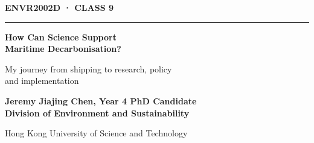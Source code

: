 \documentclass[aspectratio=169,11pt]{beamer}
\newcommand{\partlabel}[1]{%
  {\color{Navy}\fontsize{9}{11}\selectfont\bfseries\MakeUppercase{#1}\par}
}
\begin{document}
\begin{frame}[plain]
  \vspace{0.55cm}
  \partlabel{ENVR2002D · Class 9}
  \vspace{0.2cm}
  {\color{Navy}\rule{\textwidth}{0.8pt}\par}

  \vspace{0.5cm}
  {\color{Ink}\fontsize{29}{33}\selectfont\bfseries
    How Can Science Support\\
    Maritime Decarbonisation?
  \par}

  \vspace{0.5cm}
  {\color{Ink}\fontsize{15}{20}\selectfont
    My journey from shipping to research, policy\\
    and implementation
  \par}

  \vfill
  {\color{Ink}\fontsize{11.2}{14}\selectfont\bfseries
    Jeremy Jiajing Chen, Year 4 PhD Candidate\\
    Division of Environment and Sustainability
  \par}
  \vspace{0.06cm}
  {\color{Muted}\fontsize{10}{12}\selectfont Hong Kong University of Science and Technology\par}
  \vspace{0.4cm}
\end{frame}
\end{document}
